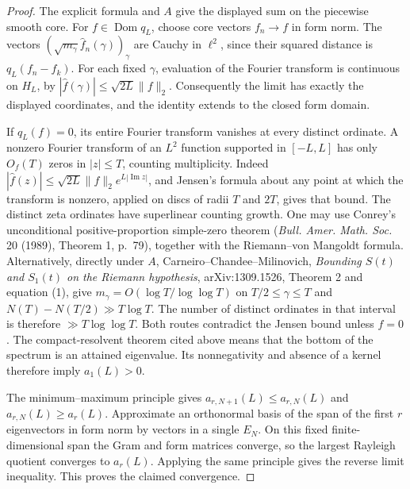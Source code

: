 \begin{proof}
The explicit formula and \(A\) give the displayed sum on the
piecewise smooth core.  For \(f\in\operatorname{Dom}q_L\), choose
core vectors \(f_n\to f\) in form norm.  The vectors
\((\sqrt{m_\gamma}\widehat f_n(\gamma))_\gamma\) are Cauchy in
\(\ell^2\), since their squared distance is \(q_L(f_n-f_k)\).
For each fixed \(\gamma\), evaluation of the Fourier transform is
continuous on \(H_L\), by
\(|\widehat f(\gamma)|\leq\sqrt{2L}\|f\|_2\).
Consequently the limit has exactly the displayed coordinates, and the
identity extends to the closed form domain.

If \(q_L(f)=0\), its entire Fourier transform vanishes at every
distinct ordinate.  A nonzero Fourier transform of an \(L^2\) function
supported in \([-L,L]\) has only \(O_f(T)\) zeros in \(|z|\leq T\),
counting multiplicity.  Indeed
\(|\widehat f(z)|\leq\sqrt{2L}\|f\|_2e^{L|\operatorname{Im}z|}\),
and Jensen's formula about any point at which the transform is nonzero,
applied on discs of radii \(T\) and \(2T\), gives that bound.
The distinct zeta ordinates have superlinear counting growth.  One may
use Conrey's unconditional positive-proportion simple-zero theorem
(\emph{Bull. Amer. Math. Soc.} 20 (1989), Theorem 1, p.~79), together
with the Riemann--von Mangoldt formula.  Alternatively, directly under
\(A\), Carneiro--Chandee--Milinovich,
\emph{Bounding \(S(t)\) and \(S_1(t)\) on the Riemann hypothesis},
arXiv:1309.1526, Theorem 2 and equation (1), give
\(m_\gamma=O(\log T/\log\log T)\) on \(T/2\leq\gamma\leq T\)
and \(N(T)-N(T/2)\gg T\log T\).  The number of distinct ordinates in
that interval is therefore \(\gg T\log\log T\).
Both routes contradict the Jensen bound unless \(f=0\).
The compact-resolvent theorem cited above means that the bottom of the
spectrum is an attained eigenvalue.  Its nonnegativity and absence of a
kernel therefore imply \(a_1(L)>0\).

The minimum--maximum principle gives
\(a_{r,N+1}(L)\leq a_{r,N}(L)\) and
\(a_{r,N}(L)\geq a_r(L)\).  Approximate an orthonormal basis of the
span of the first \(r\) eigenvectors in form norm by vectors in a
single \(E_N\).  On this fixed finite-dimensional span the Gram and
form matrices converge, so the largest Rayleigh quotient converges to
\(a_r(L)\).  Applying the same principle gives the reverse limit
inequality.  This proves the claimed convergence.
\end{proof}

